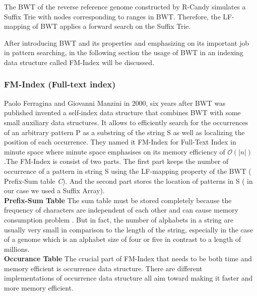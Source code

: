 \documentclass[11pt,a4paper]{report}
\begin{document}
The BWT of the reverse reference genome constructed by R-Candy simulates a Suffix 
Trie with nodes corresponding to ranges in BWT. Therefore, the LF-mapping of BWT 
applies a forward search on the Suffix Trie.

After introducing BWT and its properties and emphasizing on its important job in 
pattern searching, in the following section the usage of BWT in an indexing data 
structure called FM-Index will be discussed\cite{fmindex}. 



\subsubsection{FM-Index (Full-text index)}  
\label{FM-Index (Full-text index)}


Paolo Ferragina and Giovanni Manzini in 2000, six years after BWT was 
published invented a self-index data structure that combines BWT with 
some small auxiliary data structures. It allows to efficiently search 
for the occurrences of an arbitrary pattern P as a substring of the 
string S as well as localizing the position of each occurrence. They 
named it FM-Index for Full-Text Index in minute space where minute 
space emphasises on its memory efficiency of $\mathcal{O}(\lvert n 
\rvert)$ .The FM-Index is consist of two parts. The first part keeps 
the number of occurrence of a pattern in string S using the LF-mapping 
property of the BWT ( Prefix-Sum table \emph{C}). And the second part 
stores the location of patterns in S ( in our case we used a Suffix 
Array)\cite{Wavthesis}.\\

\textbf{Prefix-Sum Table}  The sum table must be stored completely because
the frequency of characters are independent of each other and can cause 
memory consumption problem \cite{Wavthesis}. But in  fact, the number of 
alphabets in a string are usually very small in comparison to the length 
of the string, especially in the case of a genome which is an alphabet size 
of four or five in contrast to a length of millions.
\\

\textbf{Occurance Table} The crucial part of FM-Index that needs to be 
both time and memory efficient is occurrence data structure\cite{Wavthesis}.
There are different implementations of occurrence data structure all aim 
toward making it faster and more memory efficient.
\\
\end{document}
